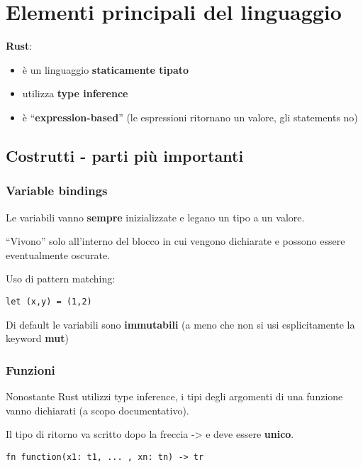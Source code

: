 \newpage
\section{Elementi principali del linguaggio}

\textbf{Rust}:

\begin{itemize}
  \item è un linguaggio \textbf{staticamente tipato}
  \item utilizza \textbf{type inference}
  \item è ``\textbf{expression-based}'' (le espressioni ritornano un
valore, gli statements no)
\end{itemize}

\subsection{Costrutti - parti più importanti}

\subsubsection{Variable bindings}

Le variabili vanno \textbf{sempre} inizializzate e legano un tipo a un valore.

``Vivono'' solo all'interno del blocco in cui vengono dichiarate e possono
essere eventualmente oscurate.

Uso di pattern matching:

\begin{lstlisting}
let (x,y) = (1,2)
\end{lstlisting}

Di default le variabili sono \textbf{immutabili} (a meno che non si usi
esplicitamente la keyword \textbf{mut})

\subsubsection{Funzioni}

Nonostante Rust utilizzi type inference, i tipi degli argomenti di una funzione
vanno dichiarati (a scopo documentativo).

Il tipo di ritorno va scritto dopo la freccia -> e deve essere
\textbf{unico}.

\begin{lstlisting}
fn function(x1: t1, ... , xn: tn) -> tr
\end{lstlisting}

